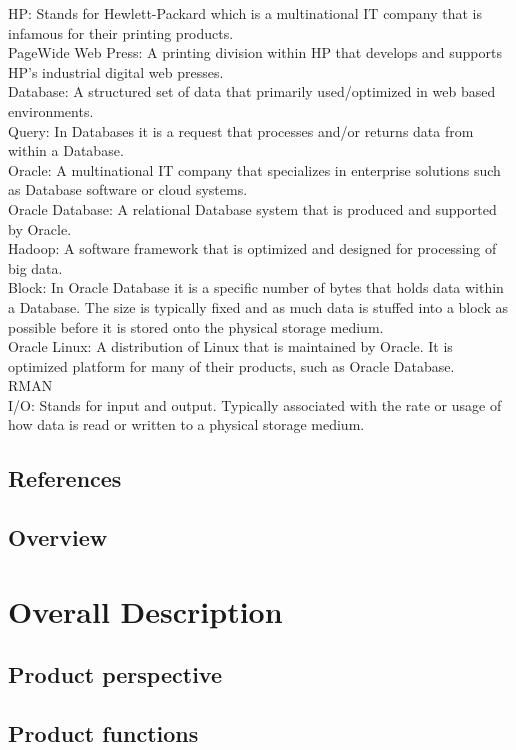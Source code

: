 \documentclass[10pt]{article}
\begin{document}
HP: Stands for Hewlett-Packard which is a multinational IT company that is infamous for their printing products.\\
PageWide Web Press: A printing division within HP that develops and supports HP's industrial digital web presses.\\
Database: A structured set of data that primarily used/optimized in web based environments.\\
Query: In Databases it is a request that processes and/or returns data from within a Database.\\
Oracle: A multinational IT company that specializes in enterprise solutions such as Database software or cloud systems.\\
Oracle Database: A relational Database system that is produced and supported by Oracle.\\
Hadoop: A software framework that is optimized and designed for processing of big data.\\
Block: In Oracle Database it is a specific number of bytes that holds data within a Database. The size is typically fixed and as much data is stuffed into a block as possible before it is stored onto the physical storage medium.\\
Oracle Linux: A distribution of Linux that is maintained by Oracle. It is optimized platform for many of their products, such as Oracle Database.\\
RMAN\\
I/O: Stands for input and output. Typically associated with the rate or usage of how data is read or written to a physical storage medium.


\subsection{References}
\subsection{Overview}


\section{Overall Description}
\subsection{Product perspective}
\subsection{Product functions}
\end{document}
